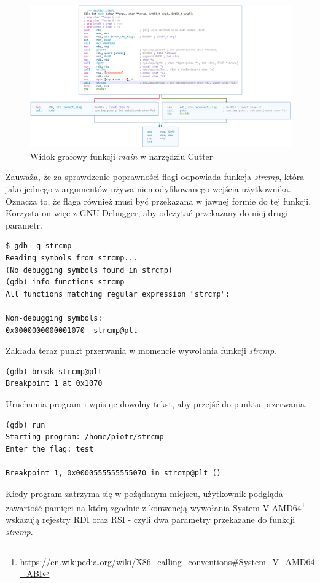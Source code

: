 \documentclass[language=polish,type=eng]{aghmodern}
\begin{document}
\begin{figure}[H]
\centering
\includegraphics[width=\textwidth]{300_cutter}
\caption{Widok grafowy funkcji \emph{main} w narzędziu Cutter}
\end{figure}

Zauważa, że za sprawdzenie poprawności flagi odpowiada funkcja \emph{strcmp}, która
jako jednego z argumentów używa niemodyfikowanego wejścia użytkownika.
Oznacza to, że flaga również musi być przekazana w jawnej formie do tej funkcji.
Korzysta on więc z GNU Debugger, aby odczytać przekazany do niej drugi parametr.

\begin{verbatim}
$ gdb -q strcmp
Reading symbols from strcmp...
(No debugging symbols found in strcmp)
(gdb) info functions strcmp
All functions matching regular expression "strcmp":

Non-debugging symbols:
0x0000000000001070  strcmp@plt
\end{verbatim}

Zakłada teraz punkt przerwania w momencie wywołania funkcji \emph{strcmp}.

\begin{verbatim}
(gdb) break strcmp@plt
Breakpoint 1 at 0x1070
\end{verbatim}

Uruchamia program i wpisuje dowolny tekst, aby przejść do punktu przerwania.

\begin{verbatim}
(gdb) run
Starting program: /home/piotr/strcmp 
Enter the flag: test

Breakpoint 1, 0x0000555555555070 in strcmp@plt ()
\end{verbatim}

Kiedy program zatrzyma się w pożądanym miejscu, użytkownik podgląda zawartość pamięci na którą
zgodnie z konwencją wywołania System V AMD64\footnote{
\url{https://en.wikipedia.org/wiki/X86_calling_conventions\#System_V_AMD64_ABI}}
wskazują rejestry RDI oraz RSI - czyli dwa parametry przekazane do funkcji \emph{strcmp}.
\end{document}
